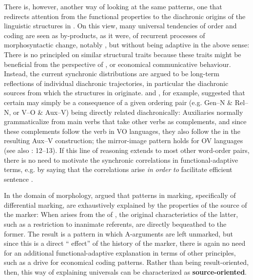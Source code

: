 \documentclass[output=paper]{langsci/langscibook}
\begin{document}
There is, however, another way of looking at the same patterns, one that redirects attention from the functional properties to the diachronic origins of the linguistic structures in . On this view, many universal tendencies of order and coding are seen as by-products, as it were, of recurrent processes of morphosyntactic change, notably , but without being adaptive in the above sense: There is no principled  on similar structural traits because these traits might be beneficial from the perspective of ,  or economical communicative behaviour. Instead, the current synchronic distributions are argued to be long-term reflections of individual diachronic trajectories, in particular the diachronic sources from which the structures in  originate. \citet{Givón1984} and \citet{Aristar1991}, for example, suggested that certain  may simply be a consequence of a given ordering pair (e.g. Gen–N \& Rel–N, or V–O \& Aux–V) being directly related diachronically: Auxiliaries normally grammaticalize from main verbs that take other verbs as complements, and since these complements follow the verb in VO languages, they also follow the  in the resulting Aux–V construction; the mirror-image pattern holds for OV languages (see also \citealt{Lehmann1986}: 12–13). If this line of reasoning extends to most other word-order pairs, there is no need to motivate the synchronic correlations in functional-adaptive terms, e.g. by saying that the correlations arise \textit{in} \textit{order} \textit{to} facilitate efficient sentence . 

In the domain of morphology, \citet{Garrett1990} argued that patterns in  marking, specifically of differential  marking, are exhaustively explained by the properties of the source of the  marker: When   arises from the  of  , the original characteristics of the latter, such as a restriction to inanimate referents, are directly bequeathed to the former. The result is a pattern in which  A-arguments are left unmarked, but since this is a direct “ effect” \citep{Hopper1991} of the history of the  marker, there is again no need for an additional functional-adaptive explanation in terms of other principles, such as a drive for economical coding patterns. Rather than being result-oriented, then, this way of explaining universals can be characterized as \textbf{source-oriented}.
\end{document}
